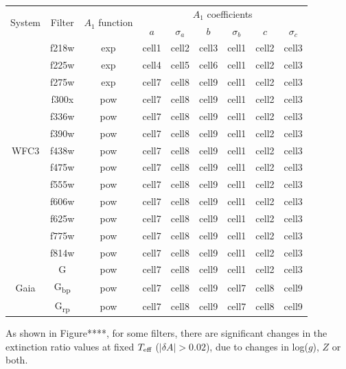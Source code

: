 \documentclass[usenatbib]{mnras}
\begin{document}
\begin{table}
\begin{tabular}{ccccccccc}
\hline
\multirow{2}{*}{System} & \multirow{2}{*}{Filter} & \multirow{2}{*}{$A_{1}$ function} & \multicolumn{6}{c}{$A_{1}$ coefficients} \\ \cline{4-9} %
& & & $a$ & $\sigma_{a}$ & $b$ & $\sigma_{b}$ & $c$ & $\sigma_{c}$ \\ \hline
& f218w & exp & cell1 & cell2 & cell3 & cell1 & cell2 & cell3 \\
& f225w & exp & cell4 & cell5 & cell6 & cell1 & cell2 & cell3 \\
& f275w & exp & cell7 & cell8 & cell9 & cell1 & cell2 & cell3 \\
& f300x & pow & cell7 & cell8 & cell9 & cell1 & cell2 & cell3 \\
& f336w & pow & cell7 & cell8 & cell9 & cell1 & cell2 & cell3 \\
& f390w & pow & cell7 & cell8 & cell9 & cell1 & cell2 & cell3 \\
WFC3 & f438w & pow & cell7 & cell8 & cell9 & cell1 & cell2 & cell3 \\
& f475w & pow & cell7 & cell8 & cell9 & cell1 & cell2 & cell3 \\
& f555w & pow & cell7 & cell8 & cell9 & cell1 & cell2 & cell3 \\
& f606w & pow & cell7 & cell8 & cell9 & cell1 & cell2 & cell3 \\
& f625w & pow & cell7 & cell8 & cell9 & cell1 & cell2 & cell3 \\
& f775w & pow & cell7 & cell8 & cell9 & cell1 & cell2 & cell3 \\
& f814w & pow & cell7 & cell8 & cell9 & cell1 & cell2 & cell3 \\ \hline
& G & pow & cell7 & cell8 & cell9 & cell1 & cell2 & cell3 \\
Gaia & G\textsubscript{bp} & pow & cell7 & cell8 & cell9 & cell7 & cell8 & cell9 \\
& G\textsubscript{rp} & pow & cell7 & cell8 & cell9 & cell7 & cell8 & cell9 \\

\end{tabular}
\label{R1_coeffs_table}
\end{table}

As shown in Figure****, for some filters, there are significant changes in the extinction ratio values at fixed $T_{\textnormal{eff}}$ ($|\delta A| > 0.02$), due to changes in log($g$), $Z$ or both.
\end{document}
